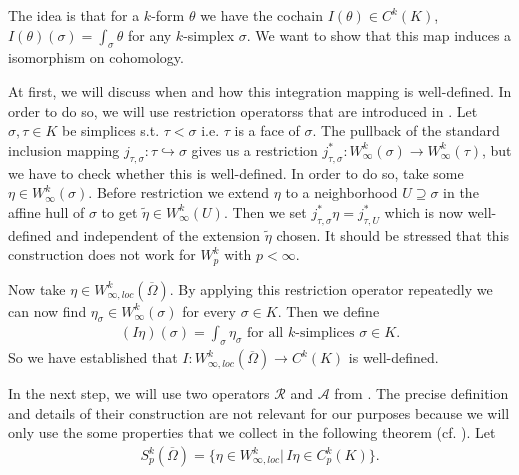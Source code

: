 \documentclass[12pt,a4paper]{article}
\theoremstyle{definition}
\newcommand{\aop}{\mathscr{A}}
\newcommand{\omegabar}{\overline{\Omega}}
\newcommand{\rop}{\mathscr{R}} %
\begin{document}
The idea is that for a $k$-form $\theta$ we have the cochain 
$I(\theta) \in C^k(K)$, $I(\theta)(\sigma) = \int_\sigma \theta$ for any
$k$-simplex $\sigma$. We want to show that this map induces a isomorphism on
cohomology. 


At first, we will discuss when and how this integration mapping is well-defined. 
In order to do so, we will use restriction operatorss that are introduced in
\cite[p.191]{goldshtein}. Let $\sigma, \tau \in K$ be simplices s.t.
$\tau < \sigma$ i.e. $\tau$ is a face of $\sigma$. The pullback of the standard
inclusion mapping $j_{\tau, \sigma}: \tau \hookrightarrow \sigma$ gives us 
a restriction 
$j^*_{\tau, \sigma}: W^k_\infty(\sigma) \rightarrow W^k_\infty(\tau)$, but 
we have to check whether this is well-defined. In order to do so, take 
some $\eta \in W^k_\infty(\sigma)$. Before restriction we extend $\eta$ to 
a neighborhood $U \supseteq \sigma$ in the affine hull of $\sigma$ to 
get $\tilde{\eta} \in W^k_\infty(U)$. Then we set 
$j^*_{\tau, \sigma} \eta = j^*_{\tau, U}$ which is now well-defined and 
independent of the extension $\tilde{\eta}$ chosen. It should be stressed 
that this construction does not work for $W^k_p$ with $p < \infty$. 


Now take $\eta \in W^k_{\infty,loc}(\omegabar)$. By applying this restriction
operator repeatedly we can now find $\eta_\sigma \in W^k_\infty(\sigma)$ for 
every $\sigma \in K$. Then we define 
\begin{align*}
    (I\eta) (\sigma) = \int_\sigma \eta_\sigma 
    \text{ for all $k$-simplices } \sigma \in K .
\end{align*}
So we have established that $I: W^k_{\infty,loc}(\omegabar) \rightarrow C^k(K)$ 
is well-defined.


In the next step, we will use two operators $\rop$ and $\aop$ from 
\cite{goldshtein}.
The precise definition and details of their construction
are not relevant for our purposes because we will only use
the some properties that we collect in the following theorem
(cf. \cite[Thm.2]{goldshtein}). Let 
\begin{align*}
    S^k_p(\omegabar) = \{ \eta \in W^k_{\infty,loc} | \, 
    I\eta \in C^k_p(K)\}.
\end{align*}
\end{document}
